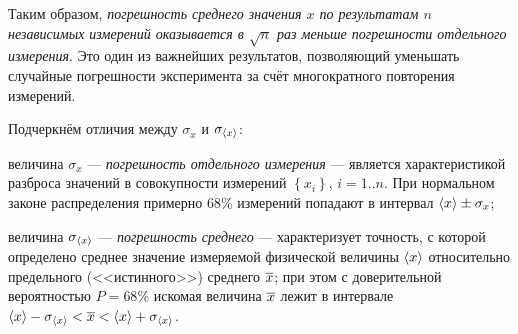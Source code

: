 Таким образом, \emph{погрешность среднего значения $x$ по результатам
$n$ независимых измерений оказывается в $\sqrt{n}$ раз меньше погрешности
отдельного измерения}. Это один из важнейших результатов, позволяющий
уменьшать случайные погрешности эксперимента за счёт многократного
повторения измерений.

Подчеркнём отличия между $\sigma_{x}$ и $\sigma_{\left<x\right>}$:

величина $\sigma_{x}$ --- \emph{погрешность отдельного
измерения} --- является характеристикой разброса значений
в совокупности измерений $\left\{ x_{i}\right\} $, $i=1..n$. При
нормальном законе распределения примерно 68\% измерений попадают в
интервал $\left<x\right>\pm\sigma_{x}$;

величина $\sigma_{\left<x\right>}$ --- \emph{погрешность
среднего} --- характеризует точность, с которой определено
среднее значение измеряемой физической величины $\left<x\right>$ относительно
предельного (<<истинного>>) среднего $\overline{x}$;
при этом с доверительной вероятностью $P=68\%$ искомая величина $\overline{x}$
лежит в интервале
$\left<x\right>-\sigma_{\left<x\right>}<\overline{x}<\left<x\right>+\sigma_{\left<x\right>}$.



